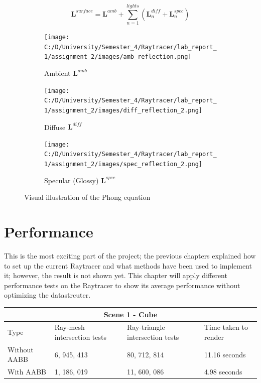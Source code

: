 \documentclass[11pt,a4paper]{article}
\begin{document}
	\begin{equation}
		\pmb{L}^{surface}= \pmb{L}^{amb} + \sum_{n=1}^{lights} (\pmb{L}_n^{diff} + \pmb{L}_n^{spec})
	\end{equation}
	
	
	\begin{figure}[ht]
		\begin{center}
			\begin{subfigure}{.3\textwidth}
				\centering
				\texttt{[image: C:/D/University/Semester\_4/Raytracer/lab\_report\_1/assignment\_2/images/amb\_reflection.png]}  
				\caption{Ambient $ \pmb{L}^{amb} $}
				\label{fig:sub-first}
			\end{subfigure}
			\begin{subfigure}{.3\textwidth}
				\centering
				\texttt{[image: C:/D/University/Semester\_4/Raytracer/lab\_report\_1/assignment\_2/images/diff\_reflection\_2.png]}  
				\caption{Diffuse $ \pmb{L}^{diff} $}
				\label{fig:sub-second}
			\end{subfigure}
			\begin{subfigure}{.3\textwidth}
				\centering
				\texttt{[image: C:/D/University/Semester\_4/Raytracer/lab\_report\_1/assignment\_2/images/spec\_reflection\_2.png]}  
				\caption{ Specular (Glossy)  $ \pmb{L}^{spec} $}
				\label{fig:sub-third}
			\end{subfigure}
			
			\caption{Visual illustration of the Phong equation}
			\label{fig:6}
		\end{center}
	\end{figure}


	\section{Performance}
	This is the most exciting part of the project; the previous chapters explained how to set up the current Raytracer and what methods have been used to implement it; however, the result is not shown yet. This chapter will apply different performance tests on the Raytracer to show its average performance without optimizing the datastrcuter. 
	
	
		\begin{table}[h]
		\centering
		\begin{tabular}{ |p{3cm}||p{3cm}|p{3cm}|p{3cm}|  }
			\hline
			\multicolumn{4}{|c|}{Scene 1 - Cube} \\
			\hline
			Type   &   Ray-mesh intersection tests  & Ray-triangle intersection tests &   Time taken to render\\
			\hline
			Without AABB   & 6, 945, 413    &80, 712, 814&   11.16 seconds\\
			With AABB&   1, 186, 019  &11, 600, 086   &      4.98 seconds\\
			\hline
		\end{tabular}
	\end{table}
\end{document}
